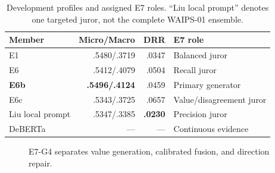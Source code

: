 \documentclass[sigconf,article,a4paper]{acmart}
\begin{document}
\begin{table}[t]
  \caption{Development profiles and assigned E7 roles. ``Liu local prompt''
  denotes one targeted juror, not the complete WAIPS-01 ensemble.}
  \label{tab:members}
  \scriptsize
  \begin{tabularx}{\columnwidth}{@{}lrrX@{}}
    \toprule
    Member & Micro/Macro & DRR & E7 role \\
    \midrule
    E1 & .5480/.3719 & .0347 & Balanced juror \\
    E6 & .5412/.4079 & .0504 & Recall juror \\
    \textbf{E6b} & \textbf{.5496/.4124} & .0459 & Primary generator \\
    E6c & .5343/.3725 & .0657 & Value/disagreement juror \\
    Liu local prompt & .5347/.3385 & \textbf{.0230} & Precision juror \\
    DeBERTa & --- & --- & Continuous evidence \\
    \bottomrule
  \end{tabularx}
\end{table}

\begin{figure}[t]
  \centering
  \caption{E7-G4 separates value generation, calibrated fusion, and direction repair.}
  \label{fig:e7}
\end{figure}
\end{document}

